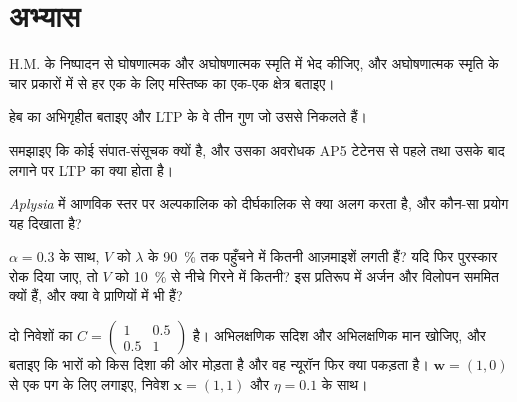 \section{अभ्यास}

\begin{exercise}[$\star$]\label{exo:b3:learning-memory:1}
H.M. के निष्पादन से घोषणात्मक और अघोषणात्मक स्मृति में भेद कीजिए, और
अघोषणात्मक स्मृति के चार प्रकारों में से हर एक के लिए मस्तिष्क का एक-एक
क्षेत्र बताइए।
\end{exercise}

\begin{exercise}[$\star$]\label{exo:b3:learning-memory:2}
हेब का अभिगृहीत बताइए और LTP के वे तीन गुण जो उससे निकलते हैं।
\end{exercise}

\begin{exercise}[$\star$]\label{exo:b3:learning-memory:3}
समझाइए कि  कोई संपात-संसूचक क्यों है, और उसका अवरोधक AP5
टेटेनस से पहले तथा उसके बाद लगाने पर LTP का क्या होता है।
\end{exercise}

\begin{exercise}[$\star$]\label{exo:b3:learning-memory:4}
\emph{Aplysia} में आणविक स्तर पर अल्पकालिक को दीर्घकालिक  से
क्या अलग करता है, और कौन-सा प्रयोग यह दिखाता है?
\end{exercise}

\begin{exercise}[$\star\star$]\label{exo:b3:learning-memory:5}
$\alpha = 0.3$ के साथ, $V$ को $\lambda$ के \qty{90}{\%} तक पहुँचने में
कितनी आज़माइशें लगती हैं? यदि फिर पुरस्कार रोक दिया जाए, तो $V$ को
\qty{10}{\%} से नीचे गिरने में कितनी? इस प्रतिरूप में अर्जन और विलोपन
सममित क्यों हैं, और क्या वे प्राणियों में भी हैं?
\end{exercise}

\begin{exercise}[$\star\star$]\label{exo:b3:learning-memory:6}
दो निवेशों का $C = \begin{pmatrix}1 & 0.5\\ 0.5 & 1\end{pmatrix}$ है।
अभिलक्षणिक सदिश और अभिलक्षणिक मान खोजिए, और बताइए कि  भारों
को किस दिशा की ओर मोड़ता है और वह न्यूरॉन फिर क्या पकड़ता है। 
$\mathbf{w} = (1,0)$ से एक पग के लिए लगाइए, निवेश $\mathbf{x}
= (1,1)$ और $\eta = 0.1$ के साथ।
\end{exercise}

